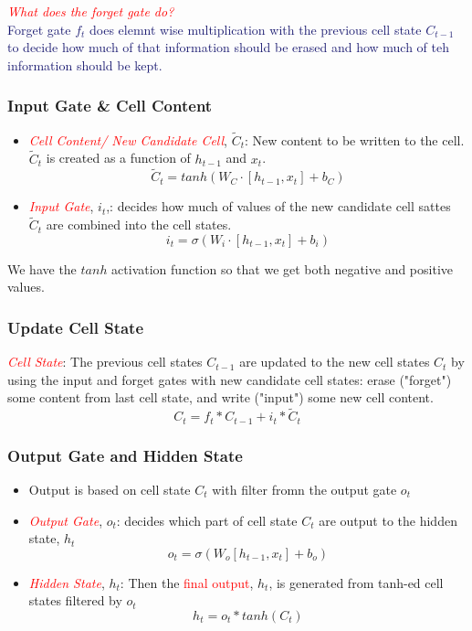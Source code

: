 \documentclass{article}
\begin{document}
\textcolor{red}{\textit{What does the forget gate do?}}\\
\textcolor{MidnightBlue}{Forget gate $f_t$ does elemnt wise multiplication with the previous cell state $C_{t-1}$ to decide how much of that information should be erased and how much of teh information should be kept. } \\



\subsubsection{Input Gate \& Cell Content}
\begin{itemize}
    \item \textcolor{red}{\textit{Cell Content/ New Candidate Cell}}, $\tilde{C}_t $: New content to be written to the cell. $\tilde{C}_t$ is created as a function of $h_{t-1}$ and $x_t$.\\
                    $$ \tilde{C}_t = tanh(W_C \cdot [h_{t-1}, x_t] + b_C)  $$
    \item \textcolor{red}{\textit{Input Gate}}, $i_t$,: decides how much of values of the new candidate cell sattes $\tilde{C}_t$ are combined into the cell states.\\
                    $$i_t = \sigma(W_i \cdot [h_{t-1}, x_t] + b_i)  $$
\end{itemize}


We have the $tanh$ activation function so that we get both negative and positive values. 
\subsubsection{Update Cell State}
\textcolor{red}{\textit{Cell State}}: The previous cell states $C_{t-1}$ are updated to the new cell states $C_t$ by using the input and forget gates with new candidate cell states:  erase ("forget") some content from last cell state, and write ("input") some new cell content.
$$ C_t = f_t \ast C_{t-1} + i_t \ast \tilde{C}_t  $$
\subsubsection{Output Gate and Hidden State}
\begin{itemize}
    \item Output is based on cell state $C_t$ with filter fromn the output gate $o_t$
    \item \textcolor{red}{\textit{Output Gate}}, $o_t$: decides which part of cell state $C_t$ are output to the hidden state, $h_t$
    $$o_t = \sigma(W_o [h_{t-1}, x_t] + b_o) $$
    \item \textcolor{red}{\textit{Hidden State}}, $h_t$: Then the \textcolor{red}{final output},  $h_t$, is generated from tanh-ed cell states filtered by $o_t$
    $$ h_t = o_t \ast tanh(C_t)$$
\end{itemize}
\end{document}
